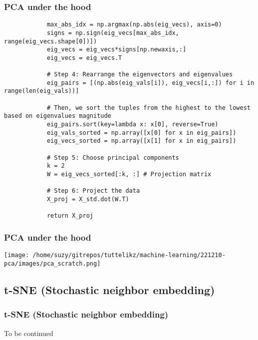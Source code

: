 \documentclass{beamer}
\begin{document}
    \begin{frame}[fragile]
        \frametitle{PCA under the hood}
        \begin{center}
        \scriptsize
        \begin{verbatim}
            max_abs_idx = np.argmax(np.abs(eig_vecs), axis=0)
            signs = np.sign(eig_vecs[max_abs_idx, range(eig_vecs.shape[0])])
            eig_vecs = eig_vecs*signs[np.newaxis,:]
            eig_vecs = eig_vecs.T

            # Step 4: Rearrange the eigenvectors and eigenvalues 
            eig_pairs = [(np.abs(eig_vals[i]), eig_vecs[i,:]) for i in range(len(eig_vals))]

            # Then, we sort the tuples from the highest to the lowest based on eigenvalues magnitude
            eig_pairs.sort(key=lambda x: x[0], reverse=True)
            eig_vals_sorted = np.array([x[0] for x in eig_pairs])
            eig_vecs_sorted = np.array([x[1] for x in eig_pairs])
            
            # Step 5: Choose principal components
            k = 2
            W = eig_vecs_sorted[:k, :] # Projection matrix

            # Step 6: Project the data
            X_proj = X_std.dot(W.T)

            return X_proj
        \end{verbatim}
        \end{center}
    \end{frame}

    \begin{frame}
        \frametitle{PCA under the hood}
        \begin{center}
            \texttt{[image: /home/suzy/gitrepos/tuttelikz/machine-learning/221210-pca/images/pca\_scratch.png]}
        \end{center}
    \end{frame}

    \subsection{t-SNE (Stochastic neighbor embedding)}
    \begin{frame}
        \frametitle{t-SNE (Stochastic neighbor embedding)}
        \begin{center}
            To be continued
        \end{center}
    \end{frame}
\end{document}
